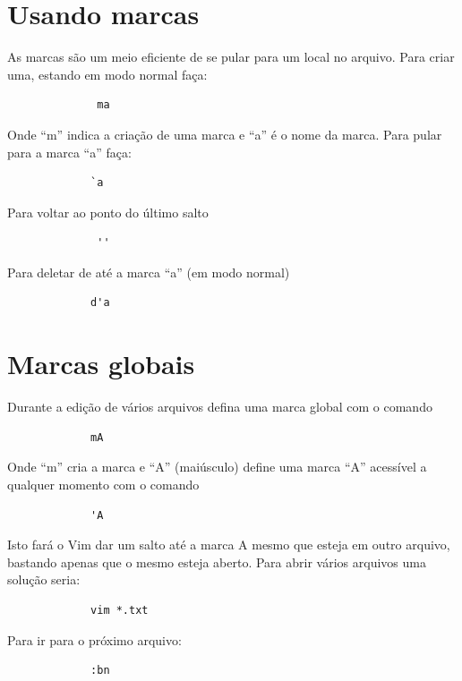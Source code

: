 \documentclass[10pt,a4paper,openany]{book}
\begin{document}
\section{Usando marcas}
\label{sec:Usando marcas}

As marcas são um meio eficiente de se pular para um local no arquivo. Para
criar uma,  estando em modo normal faça:

\begin{verbatim}
			  ma
\end{verbatim}

Onde ``m'' indica a criação de uma marca e ``a'' é o nome da marca. Para pular para a marca ``a'' faça:

\begin{verbatim}
			 `a
\end{verbatim}

Para voltar ao ponto do último salto

\begin{verbatim}
			  ''
\end{verbatim}

Para deletar de até a marca ``a'' (em modo normal)

\begin{verbatim}
			 d'a
\end{verbatim}

\section{Marcas globais}
Durante a edição de vários arquivos defina uma marca global com o comando

\begin{verbatim}
			 mA
\end{verbatim}

Onde ``m'' cria a marca e ``A'' (maiúsculo) define uma marca ``A'' acessível a qualquer momento com o comando

\begin{verbatim}
			 'A
\end{verbatim}

Isto fará o Vim dar um salto até a marca A mesmo que esteja em outro
arquivo, bastando apenas que o mesmo esteja aberto. Para abrir vários
arquivos uma solução seria:

\begin{verbatim}
			 vim *.txt
\end{verbatim}

Para ir para o próximo arquivo:

\begin{verbatim}
			 :bn
\end{verbatim}
\end{document}

